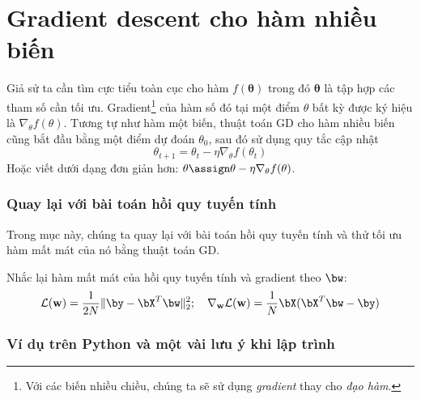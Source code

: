  
\section{Gradient descent cho hàm nhiều biến}
Giả sử ta cần tìm cực tiểu toàn cục cho hàm $f(\mathbf{\theta})$ trong đó
$\mathbf{\theta}$ là tập hợp các tham số cần tối ưu. Gradient\footnote{Với các
biến nhiều chiều, chúng ta sẽ sử dụng \textit{gradient} thay cho \textit{đạo
hàm}.} của hàm số đó tại một điểm $\theta$ bất kỳ được ký hiệu là
$\nabla_{\theta}f(\theta)$. Tương tự như hàm một biến, thuật toán GD cho hàm
nhiều biến cũng bắt đầu bằng một điểm dự đoán $\theta_{0}$, sau đó sử dụng quy
tắc cập nhật
\begin{equation} 
\boxed{
\theta_{t+1} = \theta_{t} - \eta \nabla_{\theta} f(\theta_{t}) 
}
\end{equation} 
Hoặc viết dưới dạng đơn giản hơn: $\theta \assign \theta - \eta \nabla_{\theta}
f(\theta)$.
 
 
 
\subsubsection{Quay lại với bài toán hồi quy tuyến tính}

Trong mục này, chúng ta quay lại với bài toán hồi quy tuyến tính và thử tối ưu
hàm mất mát của nó bằng thuật toán GD.
 
Nhắc lại hàm mất mát của hồi quy tuyến tính và gradient theo $\bw$:
\begin{equation} 
\mathcal{L}(\mathbf{w}) = \frac{1}{2N}\|\by - \bX^T\bw\|_2^2; \quad \nabla_{\mathbf{w}}\mathcal{L}(\mathbf{w}) =  
\frac{1}{N}\bX(\bX^T\bw - \by) 
\end{equation} 

  
\subsubsection{Ví dụ trên Python và một vài lưu ý khi lập trình}
 
 
 
 

